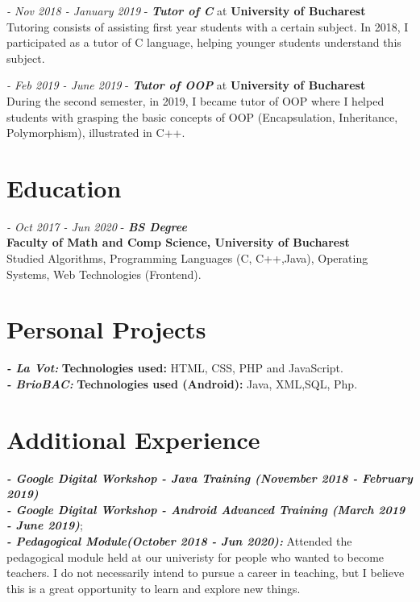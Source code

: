\documentclass{article}
\begin{document}
\begin{multicols}{2}
        \vspace{0.5cm}
        \large \textit{- Nov 2018 - January 2019} - \textbf{\textit{Tutor of C}} at \textbf{University of Bucharest}
        \vspace{0.35cm}\\  \normalsize \indent Tutoring consists of assisting first year students with a certain subject. In 2018, I participated as a tutor of C language, helping younger students understand this subject.
        
        \vspace{0.5cm}
        \large \textit{- Feb 2019 - June 2019} - \textbf{\textit{Tutor of OOP}} at \textbf{University of Bucharest}
        \vspace{0.35cm}\\  \normalsize \indent During the second semester, in 2019, I became tutor of OOP where I helped students with grasping the basic concepts of OOP (Encapsulation, Inheritance, Polymorphism), illustrated in C++.
        

    \section*{Education}
        \large \textit{- Oct 2017 - Jun 2020} - \textbf{\textit{BS Degree}} \\ \textbf{Faculty of Math and Comp Science, University of Bucharest}
        \vspace{0.35cm}\\ \normalsize\indent Studied   Algorithms,   Programming   Languages   (C,   C++,Java), Operating Systems, Web Technologies (Frontend).
        

    \section*{Personal Projects}
        \textbf{\textit{- La Vot:}} \textbf{Technologies used:} HTML, CSS, PHP and JavaScript.
        \vspace{0.35cm}\\ \textbf{\textit{- BrioBAC:}} \textbf{Technologies used (Android):} Java, XML,SQL, Php.

    \section*{Additional Experience}
        \textbf{\textit{- Google Digital Workshop - Java Training (November 2018 - February 2019)}}
        \vspace{0.35cm}\\ \textbf{\textit{- Google Digital Workshop - Android Advanced Training (March 2019 - June 2019)}};
        \vspace{0.35cm}\\ \textbf{\textit{- Pedagogical Module(October 2018 - Jun 2020):}} Attended the pedagogical module held at our univeristy for people who wanted to become teachers. I do not necessarily intend to pursue a career in teaching, but I believe this is a great opportunity to learn and explore new things. 
    

\end{multicols}
\end{document}
